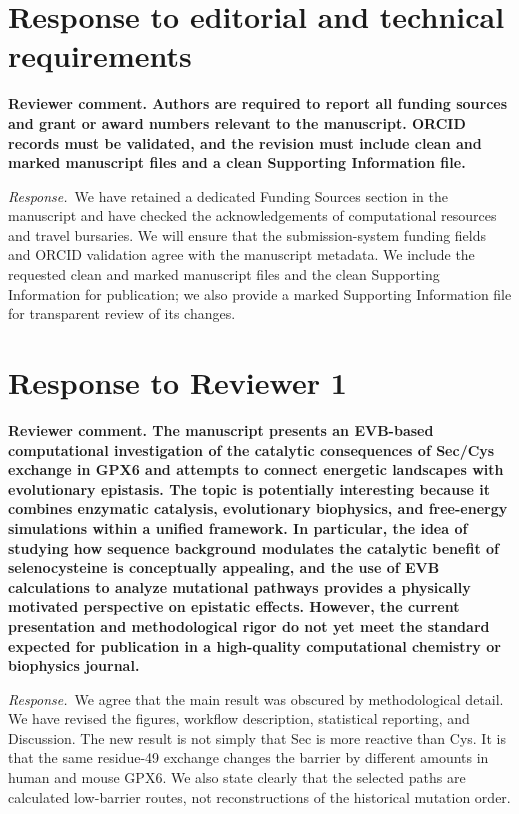 \documentclass[11pt]{article}
\newcommand{\ReviewerComment}[1]{\par\noindent\textbf{Reviewer comment. #1}\par}
\newcommand{\AuthorResponse}{\par\noindent\textit{Response.}\ }
\begin{document}
\section*{Response to editorial and technical requirements}

\ReviewerComment{Authors are required to report all funding sources and grant or award
numbers relevant to the manuscript. ORCID records must be validated, and the revision
must include clean and marked manuscript files and a clean Supporting Information file.}

\AuthorResponse We have retained a dedicated Funding Sources section in the manuscript
and have checked the acknowledgements of computational resources and travel bursaries.
We will ensure that the submission-system funding fields and ORCID validation agree with
the manuscript metadata. We include the requested clean and marked manuscript files and
the clean Supporting Information for publication; we also
provide a marked Supporting Information file for transparent review of its changes.

\newpage
\section*{Response to Reviewer 1}

\ReviewerComment{The manuscript presents an EVB-based computational investigation of the catalytic consequences of Sec/Cys exchange in GPX6 and attempts to connect energetic landscapes with evolutionary epistasis. The topic is potentially interesting because it combines enzymatic catalysis, evolutionary biophysics, and free-energy simulations within a unified framework. In particular, the idea of studying how sequence background modulates the catalytic benefit of selenocysteine is conceptually appealing, and the use of EVB calculations to analyze mutational pathways provides a physically motivated perspective on epistatic effects. However, the current presentation and methodological rigor do not yet meet the standard expected for publication in a high-quality computational chemistry or biophysics journal.}

\AuthorResponse We agree that the main result was obscured by methodological detail. We
have revised the figures, workflow description, statistical reporting, and Discussion.
The new result is not simply that Sec is more reactive than Cys. It is that the same
residue-49 exchange changes the barrier by different amounts in human and mouse GPX6.
We also state clearly that the selected paths are calculated low-barrier routes, not
reconstructions of the historical mutation order.
\end{document}
